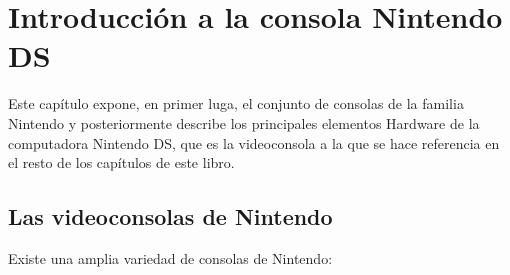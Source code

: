 \chapter{Introducción a la consola Nintendo DS}

Este capítulo expone, en primer luga, el conjunto de consolas de la familia Nintendo y posteriormente describe los principales elementos Hardware de la computadora Nintendo DS, que es la videoconsola a la que se hace referencia en el resto de los capítulos de este libro.

\section{Las videoconsolas de Nintendo}

Existe una amplia variedad de consolas de Nintendo:

